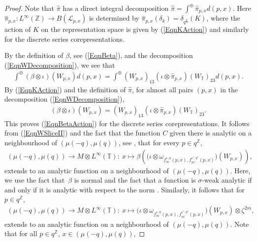 \documentclass[pdftex]{sigma}
\numberwithin{equation}{section}
\theoremstyle{definition}
\newcommand{\ep}{\varepsilon}
\begin{document}
\begin{proof}
Note that $\hat{\pi}$ has a direct integral decomposition $\hat{\pi} =  \int^\oplus
\hat{\pi}_{p,x} d(p,x)$. Here $\hat{\pi}_{p,x}: L^\infty(\mathbb{Z}) \rightarrow B(\mathcal{L}_{p,x})$ is determined by $\hat{\pi}_{p,x}(\delta_k) = \delta_{q^{\frac{k}{2}}}(K)$, where the action of $K$ on the representation space is given by (\ref{EqnKAction}) and similarly for the discrete series corepresentations.

By the def\/inition of $\beta$, see (\ref{EqnBeta}), and the decomposition (\ref{EqnWDecomposition}), we see that
\begin{gather*}
 \int^\oplus (\beta \otimes \iota)(W_{p,x}) d(p,x) =
 \int^\oplus (W_{p,x})_{13}   (\iota \otimes \hat{\pi}_{p,x}) (W_{\mathbb{T}})_{23}   d(p,x).
\end{gather*}
By (\ref{EqnKAction}) and the def\/inition of $\hat{\pi}$,  for almost all pairs $(p,x)$ in the decomposition (\ref{EqnWDecomposition}),
\begin{gather}\label{EqnActionDec}
(\beta \otimes \iota)(W_{p,x}) = (W_{p,x})_{13} (\iota \otimes \hat{\pi}_{p,x})(W_{\mathbb{T}})_{23}.
\end{gather}
This proves (\ref{EqnBetaAction}) for the discrete series corepresentations.
It follows from (\ref{EqnWSliceII}) and the fact that the function $C$ given there is analytic on a neighbourhood of $(\mu(-q), \mu(q))$, see \cite[Section~10.3]{GroKoeKus}, that for every $p \in q^{\mathbb{Z}}$,
\begin{gather}\label{EqnLHS}
(\mu(-q), \mu(q)) \rightarrow M \otimes L^\infty(\mathbb{T}): \ x \mapsto \beta \left( \big(\iota \otimes \omega_{ f_m^{\ep,\eta}(p,x) , f_{m'}^{\ep',\eta'} (p,x) }\big)(W_{p,x}) \right) ,
\end{gather}
extends to an analytic function on a neighbourhood of  $(\mu(-q), \mu(q))$. Here, we use the fact that~$\beta$ is normal and the fact that a function is $\sigma$-weak analytic if and only if it is analytic with respect to the norm \cite[Result 1.2]{KusAut}. Similarly, it follows that for $p \in q^{\mathbb{Z}}$,
\begin{gather}\label{EqnRHS}
(\mu(-q), \mu(q))\rightarrow M \otimes L^\infty(\mathbb{T}): \ x \mapsto  \big(\iota \otimes \omega_{ f_m^{\ep,\eta}(p,x), f_{m'}^{\ep',\eta'}(p,x) }\big)(W_{p,x}) \otimes \zeta^{2m},
\end{gather}
extends to an analytic function on a neighbourhood of  $(\mu(-q), \mu(q))$. Note that for all $p \in q^{\mathbb{Z}}$, $x \in (\mu(-q), \mu(q))$,

\end{proof}
\end{document}
